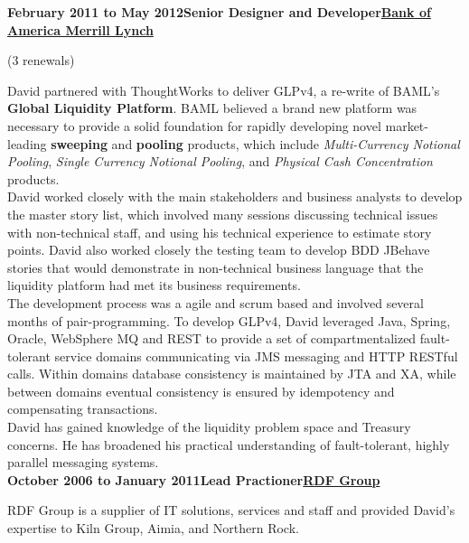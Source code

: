 \documentclass[a4paper,12pt]{article}
\newcommand{\head}[1]{\begin{center}{\large{\textbf{\sc{#1}}}}\nopagebreak\end{center}}
\newcommand{\clientwork}[3]{\textbf{#1\hfill#3\hfill#2}\nopagebreak}
\newcommand{\renewals}[2]{(#2)\nopagebreak}
\begin{document}
\head{Career History}

\clientwork{February 2011 to May 2012}{\href{http://corp.bankofamerica.com/}{Bank of America Merrill Lynch}}{Senior Designer and Developer}

\renewals{15 months}{3 renewals}


David partnered with ThoughtWorks to deliver GLPv4, a re-write of BAML's \textbf{Global Liquidity Platform}. BAML believed a brand new platform was necessary to provide a solid foundation for rapidly developing novel market-leading \textbf{sweeping} and \textbf{pooling} products, which include \emph{Multi-Currency Notional Pooling}, \emph{Single Currency Notional Pooling}, and \emph{Physical Cash Concentration} products.  \\

David worked closely with the main stakeholders and business analysts to develop the master story list, which involved many sessions discussing technical issues with non-technical staff, and using his technical experience to estimate story points. David also worked closely the testing team to develop BDD JBehave stories that would demonstrate in non-technical business language that the liquidity platform had met its business requirements.  \\

The development process was a agile and scrum based and involved several months of pair-programming. To develop GLPv4, David leveraged Java, Spring, Oracle, WebSphere MQ and REST to provide a set of compartmentalized fault-tolerant service domains communicating via JMS messaging and HTTP RESTful calls. Within domains database consistency is maintained by JTA and XA, while between domains eventual consistency is ensured by idempotency and compensating transactions. \\

David has gained knowledge of the liquidity problem space and Treasury concerns. He has broadened his practical understanding of fault-tolerant, highly parallel messaging systems. \\

\clientwork{October 2006 to January 2011}{\href{http://www.rdfgroup.com/}{RDF Group}}{Lead Practioner}

RDF Group is a supplier of IT solutions, services and staff and provided David's expertise to Kiln Group, Aimia, and Northern Rock.
\end{document}
